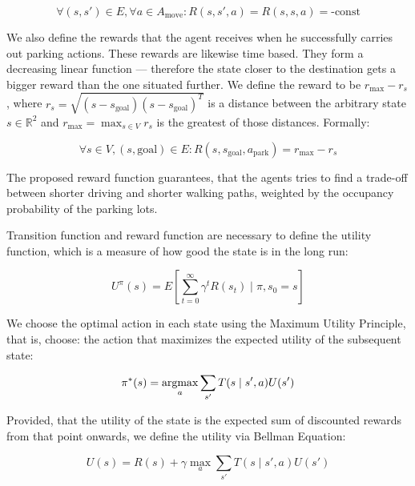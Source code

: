 \begin{equation}
\forall (s, s') \in E, \forall a \in A_{\mbox{move}}: R(s, s', a) = R(s, s, a) = \mbox{-const}
\end{equation}

We also define the rewards that the agent receives when he successfully
carries out parking actions. These rewards are likewise time based. They form
a decreasing linear function --- therefore the state closer to the destination
gets a bigger reward than the one situated further. We define the reward to be
$r_{\max} - r_s$, where $r_s = \sqrt{(s - s_{\mbox{goal}}) {(s -
s_{\mbox{goal}})}^T}$ is a distance between the arbitrary state $s \in
\mathbb{R}^2$ and $r_{\max} = \max_{s \in V}r_s$ is the greatest of those
distances. Formally:

\begin{equation}
\forall s \in V, (s,\mbox{goal}) \in E : R(s, s_{\mbox{goal}}, a_{\mbox{park}}) = r_{\max} - r_s
\end{equation}

The proposed reward function guarantees, that the agents tries to find a
trade-off between shorter driving and shorter walking paths, weighted by the
occupancy probability of the parking lots.

Transition function and reward function are necessary to define the utility
function, which is a measure of how good the state is in the long run:

\begin{equation}
U^{\pi}(s) = E\left[\sum_{t=0}^{\infty} \gamma^t R(s_t) \mid \pi,s_0 = s \right]
\end{equation}

We choose the optimal action in each state using the Maximum Utility
Principle, that is, choose: the action that maximizes the expected utility of
the subsequent state:

\begin{equation}
\label{lbl:optimal_policy}
\pi^*(s) = \mathop{\rm argmax}_a \sum_{s'} T(s \mid s', a)U(s')
\end{equation}

Provided, that the utility of the state is the expected sum of discounted
rewards from that point onwards, we define the utility via Bellman Equation:

\begin{equation}
\label{lbl:bellman_equation}
U(s) = R(s) + \gamma \max_a \sum_{s'}T(s \mid s', a)U(s')
\end{equation}

